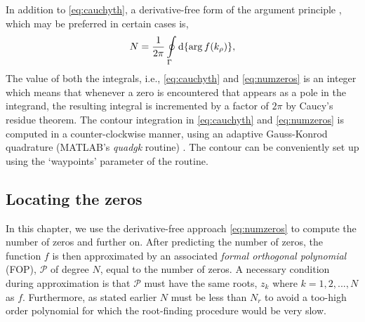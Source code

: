 \documentclass[12pt]{article}
\begin{document}
In addition to \eqref{eq:cauchyth}, a derivative-free form of the argument principle \cite{Carpentier1982c,Gillan2006c}, which may be preferred in certain cases is,
%
\begin{equation}
 N = \frac{1}{2 \pi} \oint \limits_{\Gamma} \mathop{}\!\mathrm{d} {\{ \arg f(k_{\rho})\}},
 \label{eq:numzeros}
\end{equation}
%
The value of both the integrals, i.e., \eqref{eq:cauchyth} and \eqref{eq:numzeros} is an integer which means that whenever a zero is encountered that appears as a pole in the integrand, the resulting integral is incremented by a factor of $2 \pi$ by Caucy's residue theorem. The contour integration in \eqref{eq:cauchyth} and \eqref{eq:numzeros} is computed in a counter-clockwise manner, using an adaptive Gauss-Konrod quadrature ({MATLAB}'s \emph{quadgk} routine) \cite{Shampine2008}. The contour can be conveniently set up using the `waypoints' parameter of the routine.
\subsection{Locating the zeros}
%
In this chapter, we use the derivative-free approach \eqref{eq:numzeros} to compute the number of zeros and further on. After predicting the number of zeros, the function $f$ is then approximated by an associated \emph{formal orthogonal polynomial} (FOP), $\mathcal P$ of degree $N$, equal to the number of zeros. A necessary condition during approximation is that $\mathcal P$ must have the same roots, $z_k$ where $k = 1,2,...,N$ as $f$. Furthermore, as stated earlier $N$ must be less than $N_r$ to avoid a too-high order polynomial for which the root-finding procedure would be very slow.
\end{document}
